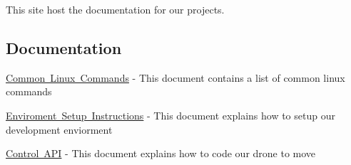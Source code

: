 This site host the documentation for our projects.

\subsection*{Documentation}

\mbox{\hyperlink{md_linux_commands}{Common Linux Commands}} -\/ This document contains a list of common linux commands

\mbox{\hyperlink{md_enviorment_setup}{Enviroment Setup Instructions}} -\/ This document explains how to setup our development enviorment

\mbox{\hyperlink{md_control_api_tutorial}{Control A\+PI}} -\/ This document explains how to code our drone to move 